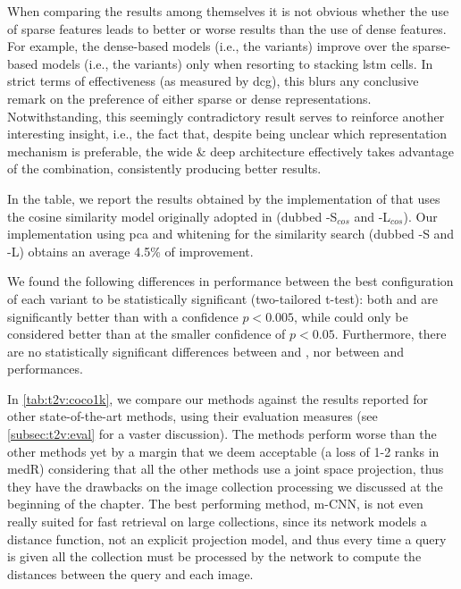 When comparing the \ttv{} results among themselves it is not obvious whether the use of sparse features leads to better or worse results than the use of dense features.
For example, the dense-based models (i.e.,  the \densettv{} variants) improve over the sparse-based models (i.e.,  the \sparsettv{} variants) only when resorting to stacking \gls{lstm} cells.
In strict terms of effectiveness (as measured by \gls{dcg}), this blurs any conclusive remark on the preference of either sparse or dense representations.
Notwithstanding, this seemingly contradictory result serves to reinforce another interesting insight, i.e.,  the fact that, despite being unclear which representation mechanism is preferable, the wide \& deep architecture effectively takes advantage of the combination, consistently producing better results.


In the table, we report the results obtained by the implementation of \wordvisual{} that uses the cosine similarity model originally adopted in \cite{dong2018predicting} (dubbed \wordvisual{}-S$_{cos}$ and \wordvisual{}-L$_{cos}$).
Our implementation using \gls{pca} and whitening for the similarity search (dubbed \wordvisual{}-S and \wordvisual{}-L) obtains an average 4.5\% of improvement.

We found the following differences in performance between the best configuration of each variant to be statistically significant (two-tailored t-test): both \densettv{} and \widedeepttv{} are significantly better than \sparsettv{} with a confidence $p<0.005$, while \widedeepttv{} could only be considered better than \wordvisual{} at the smaller confidence of $p<0.05$.
Furthermore, there are no statistically significant differences between \widedeepttv{} and \densettv{}, nor between \densettv{} and \wordvisual{} performances.

In \ref{tab:t2v:coco1k}, we compare our methods against the results reported for other state-of-the-art methods, using their evaluation measures (see \ref{subsec:t2v:eval} for a vaster discussion).
The \ttv{} methods perform worse than the other methods yet by a margin that we deem acceptable (a loss of 1-2 ranks in \gls{medR}) considering that all the other methods use a joint space projection, thus they have the drawbacks on the image collection processing we discussed at the beginning of the chapter. %
The best performing method, m-CNN, is not even really suited for fast retrieval on large collections, since its network models a distance function, not an explicit projection model, and thus every time a query is given all the collection must be processed by the network to compute the distances between the query and each image.

